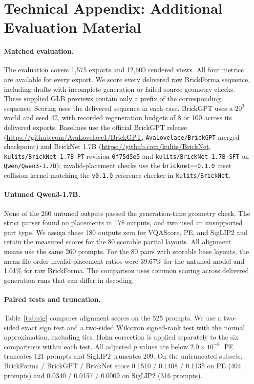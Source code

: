 \documentclass[letterpaper]{article} %
\begin{document}
\section{Technical Appendix: Additional Evaluation Material}
\label{app:eval}

\paragraph{Matched evaluation.}

The evaluation covers 1,575 exports and 12,600 rendered views. All four metrics are available for every export. We score every delivered raw BrickForma sequence, including drafts with incomplete generation or failed source geometry checks. Three supplied GLB previews contain only a prefix of the corresponding sequence. Scoring uses the delivered sequence in each case. BrickGPT uses a $20^3$ world and seed 42, with recorded regeneration budgets of 8 or 100 across its delivered exports. Baselines use the official BrickGPT release (\url{https://github.com/AvaLovelace1/BrickGPT}, \texttt{AvaLovelace/BrickGPT} merged checkpoint) and BrickNet 1.7B (\url{https://github.com/kulits/BrickNet}, \texttt{kulits/BrickNet-1.7B-PT} revision \texttt{0f75d5e5} and \texttt{kulits/BrickNet-1.7B-SFT} on \texttt{Qwen/Qwen3-1.7B}); invalid-placement checks use the \texttt{bricknet==0.1.0} inset collision kernel matching the \texttt{v0.1.0} reference checker in \texttt{kulits/BrickNet}.


\paragraph{Untuned Qwen3-1.7B.} None of the 260 untuned outputs passed the generation-time geometry check. The strict parser found no placements in 178 outputs, and two used an unsupported part type. We assign these 180 outputs zero for VQAScore, PE, and SigLIP2 and retain the measured scores for the 80 scorable partial layouts. All alignment means use the same 260 prompts. For the 80 pairs with scorable base layouts, the mean file-order invalid-placement ratios were 39.67\% for the untuned model and 1.01\% for raw BrickForma. The comparison uses common scoring across delivered generation runs that can differ in decoding.

\paragraph{Paired tests and truncation.}
Table~\ref{tab:sig} compares alignment scores on the 525 prompts. We use a two-sided exact sign test and a two-sided Wilcoxon signed-rank test with the normal approximation, excluding ties. Holm correction is applied separately to the six comparisons within each test. All adjusted $p$ values are below $2.0{\times}10^{-8}$. PE truncates 121 prompts and SigLIP2 truncates 209. On the untruncated subsets, BrickForma / BrickGPT / BrickNet score 0.1510 / 0.1408 / 0.1135 on PE (404 prompts) and 0.0340 / 0.0157 / 0.0009 on SigLIP2 (316 prompts).
\end{document}
